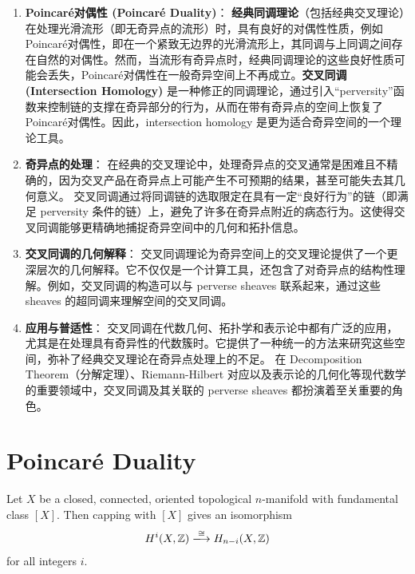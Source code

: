 \documentclass[lang=cn,zihao=5,twoside,fontset=none]{textbook}
\begin{document}
\begin{enumerate}[label=\arabic*)]
\item \textbf{Poincaré对偶性 (Poincaré Duality)}：
    \textbf{经典同调理论}（包括经典交叉理论）在处理光滑流形（即无奇异点的流形）时，具有良好的对偶性性质，例如 Poincaré对偶性，即在一个紧致无边界的光滑流形上，其同调与上同调之间存在自然的对偶性。然而，当流形有奇异点时，经典同调理论的这些良好性质可能会丢失，Poincaré对偶性在一般奇异空间上不再成立。\textbf{交叉同调 (Intersection Homology)} 是一种修正的同调理论，通过引入“perversity”函数来控制链的支撑在奇异部分的行为，从而在带有奇异点的空间上恢复了 Poincaré对偶性。因此，intersection homology 是更为适合奇异空间的一个理论工具。
	\item \textbf{奇异点的处理}：
   在经典的交叉理论中，处理奇异点的交叉通常是困难且不精确的，因为交叉产品在奇异点上可能产生不可预期的结果，甚至可能失去其几何意义。
   交叉同调通过将同调链的选取限定在具有一定“良好行为”的链（即满足 perversity 条件的链）上，避免了许多在奇异点附近的病态行为。这使得交叉同调能够更精确地捕捉奇异空间中的几何和拓扑信息。
   \item \textbf{交叉同调的几何解释}：
   交叉同调理论为奇异空间上的交叉理论提供了一个更深层次的几何解释。它不仅仅是一个计算工具，还包含了对奇异点的结构性理解。例如，交叉同调的构造可以与 perverse sheaves 联系起来，通过这些 sheaves 的超同调来理解空间的交叉同调。
   \item \textbf{应用与普适性}：
   交叉同调在代数几何、拓扑学和表示论中都有广泛的应用，尤其是在处理具有奇异性的代数簇时。它提供了一种统一的方法来研究这些空间，弥补了经典交叉理论在奇异点处理上的不足。
   在 Decomposition Theorem（分解定理）、Riemann-Hilbert 对应以及表示论的几何化等现代数学的重要领域中，交叉同调及其关联的 perverse sheaves 都扮演着至关重要的角色。
\end{enumerate}

\section{Poincar\'e Duality}

\begin{theorem}\label{thm:poincare-duality}
	Let $X$ be a closed, connected, oriented topological $n$-manifold with fundamental class $[X]$. Then capping with $[X]$ gives an isomorphism
	\[H^i(X,\bZ)\xlongrightarrow[]{\cong} H_{n-i}(X,\bZ)\]
	for all integers $i$.
\end{theorem}
\end{document}
